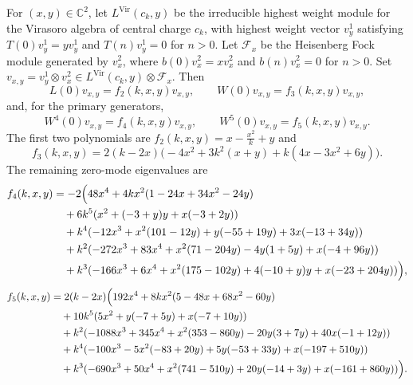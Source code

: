 \documentclass[11 pt]{amsart}
\theoremstyle{definition}
\theoremstyle{plain}
\newcommand{\Vir}{\mathrm{Vir}}
\begin{document}
For $(x,y)\in\mathbb C^2$, let $L^{\Vir}(c_k,y)$ be the irreducible
highest weight module for the Virasoro algebra of central charge $c_k$, with highest
weight vector $v^1_y$ satisfying $T(0)v^1_y=yv^1_y$ and
$T(n)v^1_y=0$ for $n>0$. Let $\mathcal F_x$ be the Heisenberg Fock
module generated by $v^2_x$, where $b(0)v^2_x=xv^2_x$ and
$b(n)v^2_x=0$ for $n>0$. Set
$v_{x,y}=v^1_y\otimes v^2_x\in
L^{\Vir}(c_k,y)\otimes\mathcal F_x$.
Then
\[
  L(0)v_{x,y}=f_2(k,x,y)v_{x,y},\qquad
  W(0)v_{x,y}=f_3(k,x,y)v_{x,y},
\]
and, for the primary generators,
\[
  W^4(0)v_{x,y}=f_4(k,x,y)v_{x,y},\qquad
  W^5(0)v_{x,y}=f_5(k,x,y)v_{x,y}.
\]
The first two polynomials are $f_2(k,x,y)=x-\frac{x^2}{k}+y$ and
\[
f_3(k,x,y)=2(k-2x)\bigl(-4x^2+3k^2(x+y)+k(4x-3x^2+6y)\bigr).
\]
The remaining zero-mode eigenvalues are
\begin{align*}
f_{4}(k,x,y)
&=
-2\Bigl(
48x^4
+4kx^2(1-24x+34x^2-24y) \\
&\quad
+6k^5(x^2+(-3+y)y+x(-3+2y)) \\
&\quad
+k^4(-12x^3+x^2(101-12y)+y(-55+19y)+3x(-13+34y)) \\
&\quad
+k^2(-272x^3+83x^4+x^2(71-204y)-4y(1+5y)+x(-4+96y)) \\
&\quad
+k^3(-166x^3+6x^4+x^2(175-102y)+4(-10+y)y+x(-23+204y))
\Bigr),
\end{align*}
\begin{align*}
f_{5}(k,x,y)
&=
2(k-2x)\Bigl(
192x^4
+8kx^2(5-48x+68x^2-60y) \\
&\quad
+10k^5(5x^2+y(-7+5y)+x(-7+10y)) \\
&\quad
+k^2(-1088x^3+345x^4+x^2(353-860y)-20y(3+7y)+40x(-1+12y)) \\
&\quad
+k^4(-100x^3-5x^2(-83+20y)+5y(-53+33y)+x(-197+510y)) \\
&\quad
+k^3(-690x^3+50x^4+x^2(741-510y)+20y(-14+3y)+x(-161+860y))
\Bigr).
\end{align*}
\end{document}
